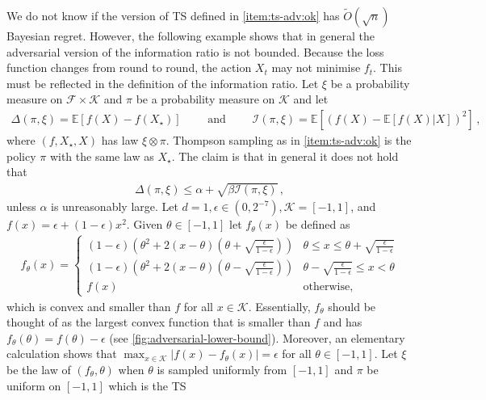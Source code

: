 \documentclass[letter, 12pt]{report}
\newcommand{\E}{\mathbb E}
\newcommand{\cK}{\mathcal K}
\newcommand{\sF}{\mathscr F}
\newcommand{\I}{\mathcal{I}}
\newcommand{\1}{\mathbf{1}}
\newcommand{\ts}{\textsc{TS}\xspace}
\theoremstyle{plain}
\theoremstyle{definition}
\theoremstyle{remark}
\begin{document}
We do not know if the version of \ts{} defined in \ref{item:ts-adv:ok} has $\tilde O(\sqrt{n})$ Bayesian regret.
However, the following example shows that in general the adversarial version of the information ratio is not bounded.
Because the loss function changes from round to round, the action $X_t$ may not minimise $f_t$. This must be reflected in the definition of the information
ratio. Let $\xi$ be a probability measure on $\sF \times \cK$ and $\pi$ be a probability measure on $\cK$ and let
\begin{align*}
    \Delta(\pi, \xi) = \E[f(X) - f(X_\star)]  \qquad \text{ and } \qquad
    \I(\pi, \xi) = \E[(f(X) - \E[f(X)|X])^2]\,,
\end{align*}
where $(f, X_\star, X)$ has law $\xi \otimes \pi$.
Thompson sampling as in \cref{item:ts-adv:ok} is the policy $\pi$ with the same law as $X_\star$. The claim is that in general it does not hold
that
\begin{align*}
    \Delta(\pi, \xi) \leq \alpha + \sqrt{\beta \I(\pi, \xi)}\,,
\end{align*}
unless $\alpha$ is unreasonably large.
Let $d = 1, \epsilon \in (0, 2^{-7}), \cK = [-1,1]$, and $f(x) = \epsilon + (1 - \epsilon) x^2$.
Given $\theta \in [-1,1]$ let $f_\theta(x)$ be defined as
\begin{align*}
    f_\theta(x) = \begin{cases}
                      (1-\epsilon) (\theta^2 + 2 (x - \theta)(\theta + \sqrt{\frac{\epsilon}{1-\epsilon}}))
                           & \theta \leq x \leq \theta + \sqrt{\frac{\epsilon}{1-\epsilon}} \\
                      (1-\epsilon) (\theta^2 + 2 (x - \theta)(\theta - \sqrt{\frac{\epsilon}{1-\epsilon}}))
                           & \theta - \sqrt{\frac{\epsilon}{1-\epsilon}} \leq x < \theta    \\
                      f(x) & \text{otherwise},
                  \end{cases}
\end{align*}
which is convex and smaller than $f$ for all $x \in \cK$.
Essentially, $f_\theta$ should be thought of as the largest convex function
that is smaller than $f$ and has $f_\theta(\theta) = f(\theta) - \epsilon$
(see \cref{fig:adversarial-lower-bound}).
Moreover, an elementary calculation shows that $\max_{x \in \cK} |f(x) - f_\theta(x)| = \epsilon$ for all $\theta \in [-1,1]$.
Let $\xi$ be the law of $(f_\theta, \theta)$ when $\theta$ is sampled uniformly from $[-1,1]$ and $\pi$ be uniform on $[-1,1]$ which is the \ts{}
\end{document}
